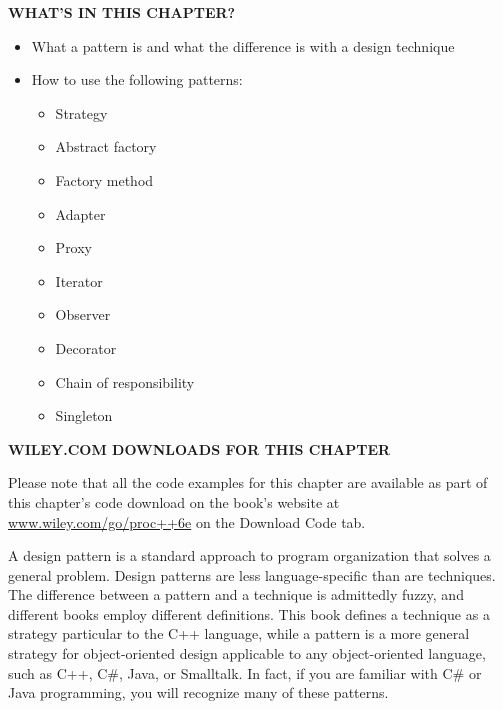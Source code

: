 \noindent
\textbf{WHAT’S IN THIS CHAPTER?}

\begin{itemize}
\item
What a pattern is and what the difference is with a design technique

\item
How to use the following patterns:

\begin{itemize}
\item
Strategy

\item
Abstract factory

\item
Factory method

\item
Adapter

\item
Proxy

\item
Iterator

\item
Observer

\item
Decorator

\item
Chain of responsibility

\item
Singleton
\end{itemize}
\end{itemize}

\noindent
\textbf{WILEY.COM DOWNLOADS FOR THIS CHAPTER}

Please note that all the code examples for this chapter are available as part of this chapter’s code download on the book’s website at \url{www.wiley.com/go/proc++6e} on the Download Code tab.

A design pattern is a standard approach to program organization that solves a general problem. Design patterns are less language-specific than are techniques. The difference between a pattern and a technique is admittedly fuzzy, and different books employ different definitions. This book defines a technique as a strategy particular to the C++ language, while a pattern is a more general strategy for object-oriented design applicable to any object-oriented language, such as C++, C\#, Java, or Smalltalk. In fact, if you are familiar with C\# or Java programming, you will recognize many of these patterns.

